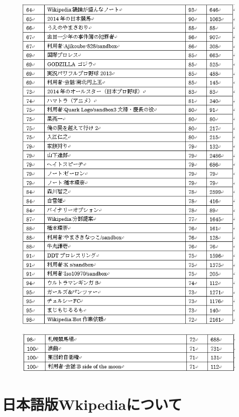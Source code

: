 \begin{figure}[H]
\centering
\includegraphics[width=12cm]{sample8.png}

\end{figure}


\begin{figure}[H]
\centering
\includegraphics[width=12cm]{sample9.png}

\end{figure}


\section{日本語版Wkipediaについて}

